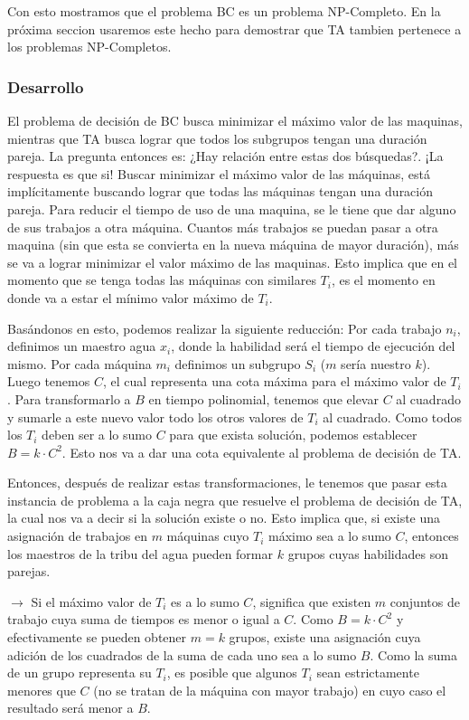 \documentclass{article}
\begin{document}
Con esto mostramos que el problema BC es un problema NP-Completo. En la próxima seccion usaremos este hecho para demostrar que TA tambien pertenece a los problemas NP-Completos.


\subsubsection{Desarrollo}
\label{sec:np-completo-bc-desarrollo}
El problema de decisión de BC busca minimizar el máximo valor de las maquinas, mientras que TA busca lograr que todos los subgrupos tengan una duración pareja. La pregunta entonces es: ¿Hay relación entre estas dos búsquedas?. ¡La respuesta es que si! Buscar minimizar el máximo valor de las máquinas, está implícitamente buscando lograr que todas las máquinas tengan una duración pareja.
Para reducir el tiempo de uso de una maquina, se le tiene que dar alguno de sus trabajos a otra máquina. Cuantos más trabajos se puedan pasar a otra maquina (sin que esta se convierta en la nueva máquina de mayor duración), más se va a lograr minimizar el valor máximo de las maquinas.
Esto implica que en el momento que se tenga todas las máquinas con similares $T_i$, es el momento en donde va a estar el mínimo valor máximo de $T_i$. 

Basándonos en esto, podemos realizar la siguiente reducción:
Por cada trabajo $n_i$, definimos un maestro agua $x_i$, donde la habilidad será el tiempo de ejecución del mismo. Por cada máquina $m_i$ definimos un subgrupo $S_i$ ($m$ sería nuestro $k$).
Luego tenemos $C$, el cual representa una cota máxima para el máximo valor de $T_i$. Para transformarlo a $B$ en tiempo polinomial, tenemos que elevar $C$ al cuadrado y sumarle a este nuevo valor todo los otros valores de $T_i$ al cuadrado. Como todos los $T_i$ deben ser a lo sumo $C$ para que exista solución, podemos establecer $B = k \cdot C^2$. Esto nos va a dar una cota equivalente al problema de decisión de TA.

Entonces, después de realizar estas transformaciones, le tenemos que pasar esta instancia de problema a la caja negra que resuelve el problema de decisión de TA, la cual nos va a decir si la solución existe o no. Esto implica que, si existe una asignación de trabajos en $m$ máquinas cuyo $T_i$ máximo sea a lo sumo $C$, entonces los maestros de la tribu del agua pueden formar $k$ grupos cuyas habilidades son parejas.

$\rightarrow$ Si el máximo valor de $T_i$ es a lo sumo $C$, significa que existen $m$ conjuntos de trabajo cuya suma de tiempos es menor o igual a $C$. Como $B = k \cdot C^2$ y efectivamente se pueden obtener $m = k$ grupos, existe una asignación cuya adición de los cuadrados de la suma de cada uno sea a lo sumo $B$. Como la suma de un grupo representa su $T_i$, es posible que algunos $T_i$ sean estrictamente menores que $C$ (no se tratan de la máquina con mayor trabajo) en cuyo caso el resultado será menor a $B$. 
\end{document}
